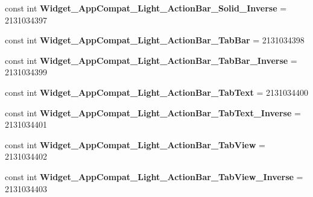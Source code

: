 \begin{DoxyCompactItemize}
\item 
\hypertarget{classClient_1_1Droid_1_1Resource_1_1Style_a2362eda584c0ed22ec1431d5e3b70f85}{}const int {\bfseries Widget\+\_\+\+App\+Compat\+\_\+\+Light\+\_\+\+Action\+Bar\+\_\+\+Solid\+\_\+\+Inverse} = 2131034397\label{classClient_1_1Droid_1_1Resource_1_1Style_a2362eda584c0ed22ec1431d5e3b70f85}

\item 
\hypertarget{classClient_1_1Droid_1_1Resource_1_1Style_a3d81be80b68d3b4532a9a14ba39c6855}{}const int {\bfseries Widget\+\_\+\+App\+Compat\+\_\+\+Light\+\_\+\+Action\+Bar\+\_\+\+Tab\+Bar} = 2131034398\label{classClient_1_1Droid_1_1Resource_1_1Style_a3d81be80b68d3b4532a9a14ba39c6855}

\item 
\hypertarget{classClient_1_1Droid_1_1Resource_1_1Style_a7edb1fe29a3e450524b8f631d8d570df}{}const int {\bfseries Widget\+\_\+\+App\+Compat\+\_\+\+Light\+\_\+\+Action\+Bar\+\_\+\+Tab\+Bar\+\_\+\+Inverse} = 2131034399\label{classClient_1_1Droid_1_1Resource_1_1Style_a7edb1fe29a3e450524b8f631d8d570df}

\item 
\hypertarget{classClient_1_1Droid_1_1Resource_1_1Style_a3c3308aa19daf6956ca19bbb27ae9e54}{}const int {\bfseries Widget\+\_\+\+App\+Compat\+\_\+\+Light\+\_\+\+Action\+Bar\+\_\+\+Tab\+Text} = 2131034400\label{classClient_1_1Droid_1_1Resource_1_1Style_a3c3308aa19daf6956ca19bbb27ae9e54}

\item 
\hypertarget{classClient_1_1Droid_1_1Resource_1_1Style_a8847384054b497b21f90bb318b09126a}{}const int {\bfseries Widget\+\_\+\+App\+Compat\+\_\+\+Light\+\_\+\+Action\+Bar\+\_\+\+Tab\+Text\+\_\+\+Inverse} = 2131034401\label{classClient_1_1Droid_1_1Resource_1_1Style_a8847384054b497b21f90bb318b09126a}

\item 
\hypertarget{classClient_1_1Droid_1_1Resource_1_1Style_a7cb57099a1df978fa76550f7f115347c}{}const int {\bfseries Widget\+\_\+\+App\+Compat\+\_\+\+Light\+\_\+\+Action\+Bar\+\_\+\+Tab\+View} = 2131034402\label{classClient_1_1Droid_1_1Resource_1_1Style_a7cb57099a1df978fa76550f7f115347c}

\item 
\hypertarget{classClient_1_1Droid_1_1Resource_1_1Style_a842d3ccbc18de5031389121c7a6c43a8}{}const int {\bfseries Widget\+\_\+\+App\+Compat\+\_\+\+Light\+\_\+\+Action\+Bar\+\_\+\+Tab\+View\+\_\+\+Inverse} = 2131034403\label{classClient_1_1Droid_1_1Resource_1_1Style_a842d3ccbc18de5031389121c7a6c43a8}


\end{DoxyCompactItemize}
